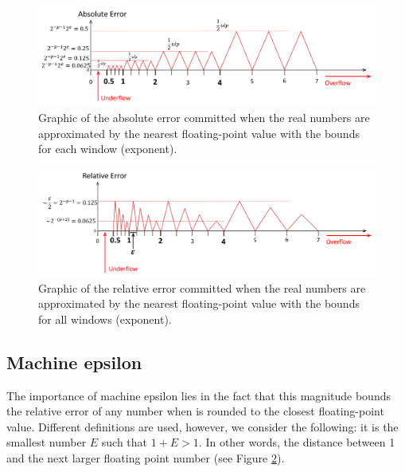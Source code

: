 \begin{figure}[h]
    \centering
    \includegraphics[width= \textwidth]{./doc/Figures/AbsErrorGraph2.png}
    \caption{Graphic of the absolute error committed when the real numbers are approximated by the nearest floating-point value with the 
    bounds for each window (exponent).}
    \label{fig:AbsErrorGraph}
\end{figure}

\begin{figure}[h]
    \centering
    \includegraphics[width= \textwidth]{./doc/Figures/RelErrorGraph2.png}
    \caption{Graphic of the relative error committed when the real numbers are approximated by the nearest floating-point value with the 
    bounds for all windows (exponent).}
    \label{fig:RelErrorGraph}
\end{figure}





        \subsection{Machine epsilon}

The importance of machine epsilon lies in the fact that this magnitude bounds the 
relative error of any number when is rounded to the closest floating-point value. 
Different definitions are used, however, we consider the following: 
it is the smallest number $E$ such that $1 + E > 1$. 
In other words, the distance between 1 and the next larger floating point number (see Figure \ref{fig:RelErrorGraph}).


